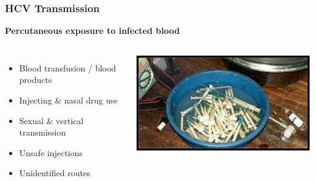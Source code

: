 \begin{frame}
\frametitle{HCV Transmission}
 
\textbf{Percutaneous exposure to infected blood}

\begin{columns}[t]


\begin{itemize}
	\item Blood transfusion / blood products
	\item Injecting \& nasal drug use
	\item Sexual \& vertical transmission
	\item Unsafe injections
	\item Unidentified routes
\end{itemize}


\includegraphics[width=\textwidth]{../../images/Needles}

\end{columns}

\end{frame}
